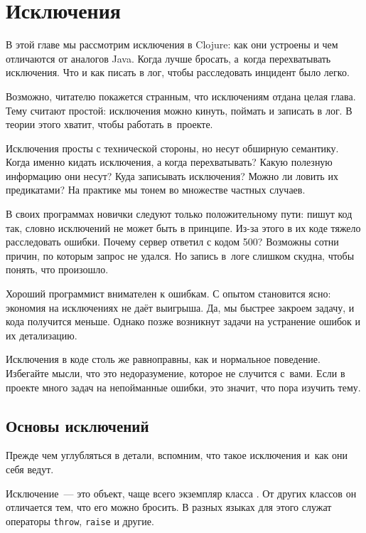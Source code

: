 \chapter{Исключения}


\begin{teaser}
В этой главе мы рассмотрим исключения в Clojure: как они устроены и чем
отличаются от аналогов Java. Когда лучше бросать, а~когда перехватывать
исключения. Что и как писать в лог, чтобы расследовать инцидент было легко.
\end{teaser}

Возможно, читателю покажется странным, что исключениям отдана целая глава. Тему
считают простой: исключения можно кинуть, поймать и записать в лог. В теории
этого хватит, чтобы работать в~проекте.

Исключения просты с технической стороны, но несут обширную семантику. Когда
именно кидать исключения, а когда перехватывать?  Какую полезную информацию они
несут? Куда записывать исключения? Можно ли ловить их предикатами? На практике
мы тонем во множестве частных случаев.

В своих программах новички следуют только положительному пути: пишут код так,
словно исключений не может быть в принципе. Из-за этого в их коде тяжело
расследовать ошибки. Почему сервер ответил с кодом 500? Возможны сотни причин,
по которым запрос не удался. Но запись в~логе слишком скудна, чтобы понять, что
произошло.

Хороший программист внимателен к ошибкам. С опытом становится ясно: экономия на
исключениях не даёт выигрыша. Да, мы быстрее закроем задачу, и кода
получится меньше. Однако позже возникнут задачи на устранение ошибок и их
детализацию.

Исключения в коде столь же равноправны, как и нормальное поведение. Избегайте
мысли, что это недоразумение, которое не случится с~вами. Если в проекте много
задач на непойманные ошибки, это значит, что пора изучить тему.

\section{Основы исключений}


Прежде чем углубляться в детали, вспомним, что такое исключения и~как они себя
ведут.

Исключение~--- это объект, чаще всего экземпляр класса . От других
классов он отличается тем, что его можно бросить. В разных языках для
этого служат операторы \verb|throw|, \verb|raise| и другие.

